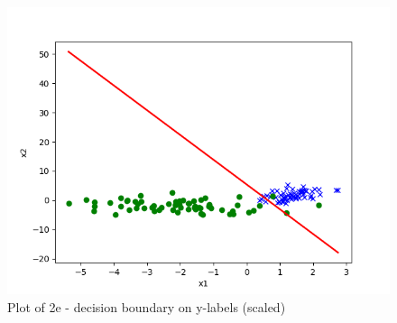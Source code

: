 \begin{answer}
\begin{figure}
  \includegraphics[width=\linewidth]{p02e_pred_test.png}
  \caption{Plot of 2e - decision boundary on y-labels (scaled)}
  \label{fig:Plot of 2e - decision boundary on y-labels (scaled)}
\end{figure}\\
\end{answer}
